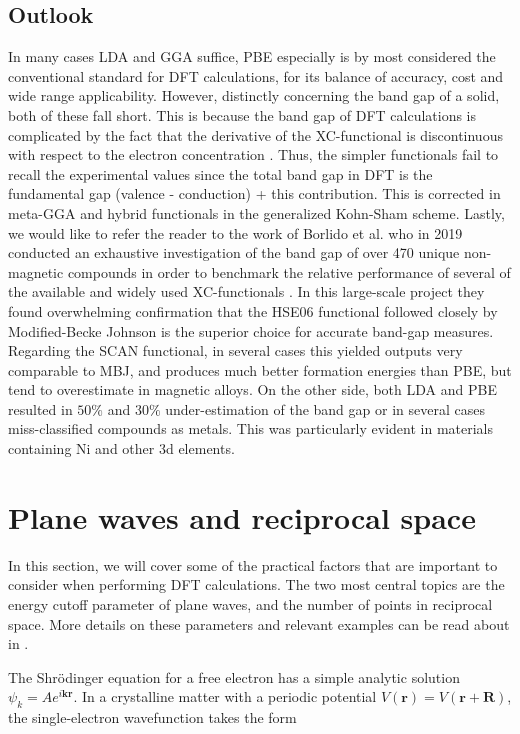 \subsection{Outlook} 
 
In many cases LDA and GGA suffice, PBE especially is by most considered the conventional standard for DFT calculations, for its balance of accuracy, cost and wide range applicability. However, distinctly concerning the band gap of a solid, both of these fall short. This is because the band gap of DFT calculations is complicated by the fact that the derivative of the XC-functional is discontinuous with respect to the electron concentration \cite{xc_derivative}. Thus, the simpler functionals fail to recall the experimental values since the total band gap in DFT is the fundamental gap (valence - conduction) + this contribution. This is corrected in meta-GGA and hybrid functionals in the generalized Kohn-Sham scheme. Lastly, we would like to refer the reader to the work of Borlido et al. who in 2019 conducted an exhaustive investigation of the band gap of over 470 unique non-magnetic compounds in order to benchmark the relative performance of several of the available and widely used XC-functionals \cite{xc_benchmark}. In this large-scale project they found overwhelming confirmation that the HSE06 functional followed closely by Modified-Becke Johnson is the superior choice for accurate band-gap measures. Regarding the SCAN functional, in several cases this yielded outputs very comparable to MBJ, and produces much better formation energies than PBE, but tend to overestimate in magnetic alloys. On the other side, both LDA and PBE resulted in $50\%$ and $30\%$ under-estimation of the band gap or in several cases miss-classified compounds as metals. This was particularly evident in materials containing Ni and other 3d elements.  
 

\section{Plane waves and reciprocal space}
In this section, we will cover some of the practical factors that are important to consider when performing DFT calculations. The two most central topics are the energy cutoff parameter of plane waves, and the number of points in reciprocal space. More details on these parameters and relevant examples can be read about in \cite{Sholl2009}. 
 
The Shr\"{o}dinger equation for a free electron has a simple analytic solution $\psi_k = Ae^{i\boldsymbol{k}\boldsymbol{r}}$. In a crystalline matter with a periodic potential $V(\boldsymbol{r}) = V(\boldsymbol{r} + \boldsymbol{R})$, the single-electron wavefunction takes the form 

